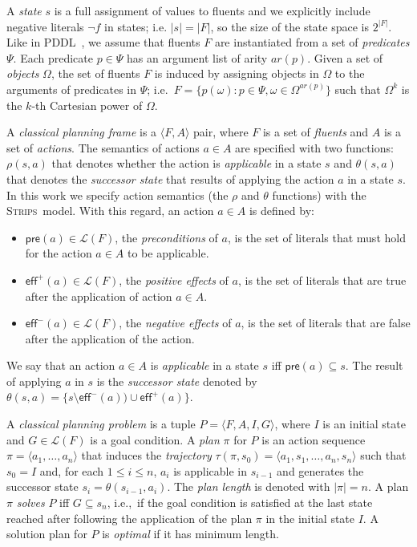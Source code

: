 \documentclass[letterpaper]{article} %
\newcommand{\tup}[1]{{\langle #1 \rangle}}
\newcommand{\pre}{\mathsf{pre}}     %
\newcommand{\eff}{\mathsf{eff}}     %
\newcommand{\strips}{\textsc{Strips}}     %
\begin{document}
A {\em state} $s$ is a full assignment of values to fluents and we explicitly include negative literals $\neg f$ in states; i.e. $|s|=|F|$, so the size of the state space is $2^{|F|}$. Like in PDDL~\cite{fox2003pddl2}, we assume that fluents $F$ are instantiated from a set of {\em predicates} $\Psi$. Each predicate $p\in\Psi$ has an argument list of arity $ar(p)$. Given a set of {\em objects} $\Omega$, the set of fluents $F$ is induced by assigning objects in $\Omega$ to the arguments of predicates in $\Psi$; i.e.~$F=\{p(\omega):p\in\Psi,\omega\in\Omega^{ar(p)}\}$ such that $\Omega^k$ is the $k$-th Cartesian power of $\Omega$.

A {\em classical planning frame} is a $\tup{F,A}$ pair, where $F$ is a set of {\em fluents} and $A$ is a set of {\em actions}. The semantics of actions $a\in A$ are specified with two functions: $\rho(s,a)$ that denotes whether the action is {\em applicable} in a state $s$ and $\theta(s,a)$ that denotes the {\em successor state} that results of applying the action $a$ in a state $s$. In this work we specify action semantics (the $\rho$ and $\theta$ functions) with the \strips\ model. With this regard, an action $a\in A$ is defined by:
\begin{itemize}
\item $\pre(a)\in\mathcal{L}(F)$, the {\em preconditions} of $a$, is the set of literals that must hold for the action $a\in A$ to be applicable.
\item $\eff^+(a)\in\mathcal{L}(F)$, the {\em positive effects} of $a$, is the set of literals that are true after the application of action $a\in A$.
\item $\eff^-(a)\in\mathcal{L}(F)$, the {\em negative effects} of $a$, is the set of literals that are false after the application of the action.
\end{itemize}
We say that an action $a\in A$ is {\em applicable} in a state $s$ iff $\pre(a)\subseteq s$. The result of applying $a$ in $s$ is the {\em successor state} denoted by $\theta(s,a)=\{s\setminus\eff^-(a))\cup\eff^+(a)\}$.

A {\em classical planning problem} is a tuple $P=\tup{F,A,I,G}$, where $I$ is an initial state and $G\in\mathcal{L}(F)$ is a goal condition. A {\em plan} $\pi$ for $P$ is an action sequence $\pi=\tup{a_1, \ldots, a_n}$ that induces the {\em trajectory} $\tau(\pi,s_0)=\tup{a_1, s_1, \ldots, a_n, s_n}$ such that $s_0=I$ and, for each {\small $1\leq i\leq n$}, $a_i$ is applicable in $s_{i-1}$ and generates the successor state $s_i=\theta(s_{i-1},a_i)$. The {\em plan length} is denoted with $|\pi|=n$. A plan $\pi$ {\em solves} $P$ iff $G\subseteq s_n$, i.e.,~if the goal condition is satisfied at the last state reached after following the application of the plan $\pi$ in the initial state $I$. A solution plan for $P$ is {\em optimal} if it has minimum length.
\end{document}
